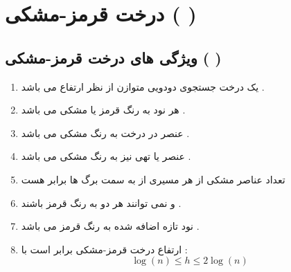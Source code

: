 \documentclass[12pt]{article}
\begin{document}
\tableofcontents

\newpage



\section{درخت
قرمز-مشکی (  )
}

\begin{latin}
\begin{center}
\end{center}
\end{latin}




\subsection {
ویژگی های درخت قرمز-مشکی (  )
}


\begin{enumerate}
	\item یک درخت جستجوی دودویی متوازن از نظر ارتفاع می باشد .
	\item هر نود به رنگ قرمز یا مشکی می باشد .
	\item عنصر
	در درخت به رنگ مشکی می باشد .
	\item عنصر
	یا تهی نیز به رنگ مشکی می باشد .
	\item تعداد عناصر مشکی از هر مسیری از
	به سمت برگ ها برابر هست
	\item {}
	و
	نمی توانند هر دو به رنگ قرمز باشند .
	\item نود تازه اضافه شده به رنگ قرمز می باشد .
	\item ارتفاع درخت قرمز-مشکی برابر است با :
	$$ \:\: \log{(n)} \leq h \leq 2 \log{(n)} $$
\end{enumerate}
\end{document}
